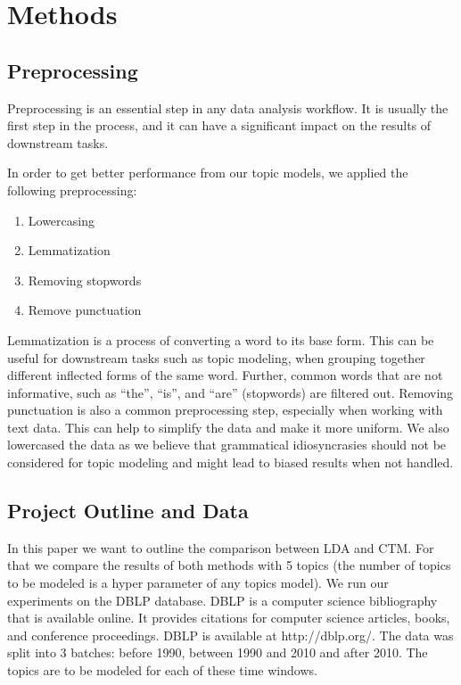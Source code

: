 \documentclass[fleqn,10pt]{SelfArx} %
\begin{document}
\section{Methods}

\subsection{Preprocessing}
Preprocessing is an essential step in any data analysis workflow. It is usually the first step in the process, and it can have a significant impact on the results of downstream tasks.

In order to get better performance from our topic models, we applied the following preprocessing:

\begin{enumerate}[noitemsep]
    \item Lowercasing
    \item Lemmatization
    \item Removing stopwords
    \item Remove punctuation
\end{enumerate}


Lemmatization is a process of converting a word to its base form. This can be useful for downstream tasks such as topic modeling, when grouping together different inflected forms of the same word. Further, common words that are not informative, such as “the”, “is”, and “are” (stopwords) are filtered out. Removing punctuation is also a common preprocessing step, especially when working with text data. This can help to simplify the data and make it more uniform. We also lowercased the data as we believe that grammatical idiosyncrasies should not be considered for topic modeling and might lead to biased results when not handled.

\subsection{Project Outline and Data}

In this paper we want to outline the comparison between LDA and CTM. For that we compare the results of both methods with 5 topics
(the number of topics to be modeled is a hyper parameter of any topics model). We run our experiments on the DBLP database. DBLP is a computer science bibliography that is available online. It provides citations for computer science articles, books, and conference proceedings. DBLP is available at http://dblp.org/. The data was split into 3 batches: before 1990, between 1990 and 2010 and after 2010. The topics are to be modeled for each of these time windows.
\end{document}
